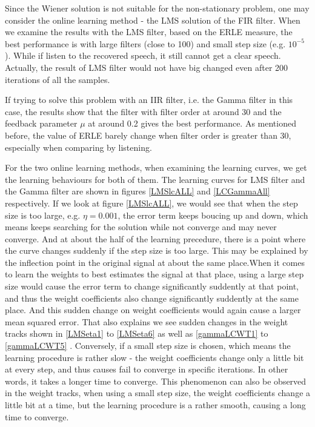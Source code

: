 \documentclass[conference]{IEEEtran}
\begin{document}
	Since the Wiener solution is not suitable for the non-stationary problem, one may consider the online learning method - the LMS solution of the FIR filter.  When we examine the results with the LMS filter, based on the ERLE measure, the best performance is with large filters (close to 100) and small step size (e.g. $10^{-5}$). While if listen to the recovered speech, it still cannot get a clear speech. Actually, the result of LMS filter would not have big changed even after 200 iterations of all the samples.
	
	If trying to solve this problem with an IIR filter, i.e. the Gamma filter in this case, the results show that the filter with filter order at around 30 and the feedback parameter $\mu$ at around 0.2 gives the best performance. As mentioned before, the value of ERLE barely change when filter order is greater than 30, especially when comparing by listening.

	For the two online learning methods, when examining the learning curves, we get the learning behaviours for both of them. The learning curves for LMS filter and the Gamma filter are shown in figures \ref{LMSlcALL} and \ref{LCGammaAll} respectively. If we look at figure \ref{LMSlcALL}, we would see that when the step size is too large, e.g. $\eta = 0.001$, the error term keeps boucing up and down, which means keeps searching for the solution while not converge and may never converge. And at about the half of the learning precedure, there is a point where the curve changes suddenly if the step size is too large. This may be explained by the inflection point in the original signal at about the same place.When it comes to learn the weights to best estimates the signal at that place, using a large step size would cause the error term to change significantly suddently at that point, and thus the weight coefficients also change significantly suddently at the same place. And this sudden change on weight coefficients would again cause a larger mean squared error. That also explains we see sudden changes in the weight tracks shown in \ref{LMSeta1} to \ref{LMSeta6} as well as \ref{gammaLCWT1} to \ref{gammaLCWT5} . Conversely, if a small step size is chosen, which means the learning procedure is rather slow - the weight coefficients change only a little bit at every step, and thus causes fail to converge in specific iterations. In other words, it takes a longer time to converge. This phenomenon can also be observed in the weight tracks, when using a small step size, the weight coefficients change a little bit at a time, but the learning procedure is a rather smooth, causing a long time to converge. 
\end{document}
